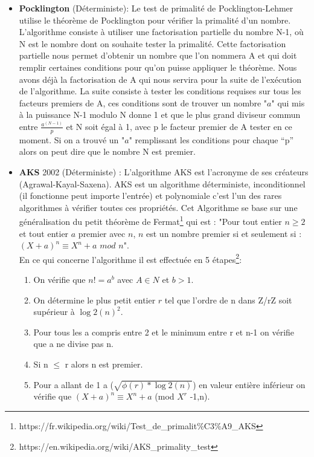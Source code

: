 \begin{itemize}
			\item \textbf{Pocklington} (Déterministe): Le test de primalité de Pocklington-Lehmer utilise le théorème de Pocklington pour vérifier la primalité d’un nombre.
L’algorithme consiste à utiliser une factorisation partielle du nombre N-1, où N est le nombre dont on souhaite tester la primalité. Cette factorisation partielle nous permet d’obtenir un nombre que l’on nommera A et qui doit remplir certaines conditions pour qu’on puisse appliquer le théorème.
Nous avons déjà la factorisation de A qui nous servira pour la suite de l'exécution de l’algorithme. 
La suite consiste à tester les conditions requises sur tous les facteurs premiers de A, ces conditions sont de trouver un nombre "$a$" qui mis à la puissance N-1 modulo N donne 1 et que le plus grand diviseur commun entre {\Large$\frac{a^{(N-1)}}{p}$} et N soit égal à 1, avec p le facteur premier de A tester en ce moment. Si on a trouvé un "$a$" remplissant les conditions pour chaque “p” alors on peut dire que le nombre N est premier.\\

			\item \textbf{AKS} 2002 (Déterministe) :			
			L'algorithme AKS est l’acronyme de ses créateurs (Agrawal-Kayal-Saxena). AKS est un algorithme déterministe, inconditionnel (il fonctionne peut importe l'entrée) et polynomiale c'est l'un des rares algorithmes à vérifier toutes ces propriétés. Cet Algorithme se base sur une généralisation du petit théorème de Fermat\footnote{https://fr.wikipedia.org/wiki/Test\_de\_primalit\%C3\%A9\_AKS} qui est : "Pour tout entier $n \geq 2$ et tout entier $a$ premier avec $n$, $n$ est un nombre premier si et seulement si : $(X + a)^n \equiv X^n + a$ $mod$ $n$".\\

En ce qui concerne l’algorithme il est effectuée en 5 étapes\footnote{https://en.wikipedia.org/wiki/AKS\_primality\_test}:\\
\begin{enumerate}
	\item On vérifie que $n!=a^b$ avec $A \in N$ et $b>1$.
	\item On détermine le plus petit entier $r$ tel que l’ordre de n dans Z/rZ soit supérieur à $\log2(n)^2$.
	\item Pour tous les a compris entre 2 et le minimum entre r et n-1 on vérifie que a ne divise pas n.
	\item Si n $\leq$ r alors n est premier.
	\item Pour a allant de 1 a ($\sqrt{\phi (r)*\log 2(n)}$) en valeur entière inférieur on vérifie que $(X + a)^n \equiv X^n + a$ (mod $X^r$ -1,n).
\end{enumerate}


\end{itemize}
